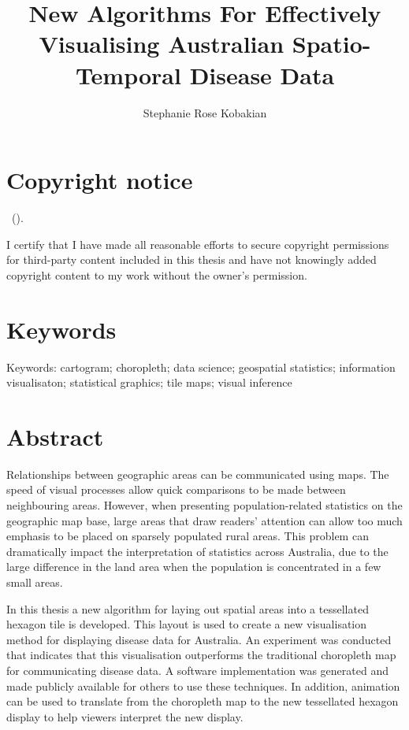 \documentclass{monashthesis}
\author{Stephanie Rose Kobakian}
\title{New Algorithms For Effectively Visualising Australian Spatio-Temporal Disease Data}
\begin{document}

\titlepage

{\sf\tighttoc\doublespacing}

\hypertarget{copyright-notice}{%
\chapter*{Copyright notice}\label{copyright-notice}}

\textcopyright { } \authorname~(\number\the\year).

I certify that I have made all reasonable efforts to secure copyright permissions for third-party content included in this thesis and have not knowingly added copyright content to my work without the owner's permission.

\newpage

\hypertarget{keywords}{%
\chapter*{Keywords}\label{keywords}}

Keywords:
cartogram; choropleth; data science; geospatial statistics; information visualisaton; statistical graphics; tile maps; visual inference

\hypertarget{abstract}{%
\chapter*{Abstract}\label{abstract}}

Relationships between geographic areas can be communicated using maps. The speed of visual processes allow quick comparisons to be made between neighbouring areas. However, when presenting population-related statistics on the geographic map base, large areas that draw readers' attention can allow too much emphasis to be placed on sparsely populated rural areas.
This problem can dramatically impact the interpretation of statistics across Australia, due to the large difference in the land area when the population is concentrated in a few small areas.

In this thesis a new algorithm for laying out spatial areas into a tessellated hexagon tile is developed. This layout is used to create a new visualisation method for displaying disease data for Australia.
An experiment was conducted that indicates that this visualisation outperforms the traditional choropleth map for communicating disease data.
A software implementation was generated and made publicly available for others to use these techniques. In addition, animation can be used to translate from the choropleth map to the new tessellated hexagon display to help viewers interpret the new display.
\end{document}
